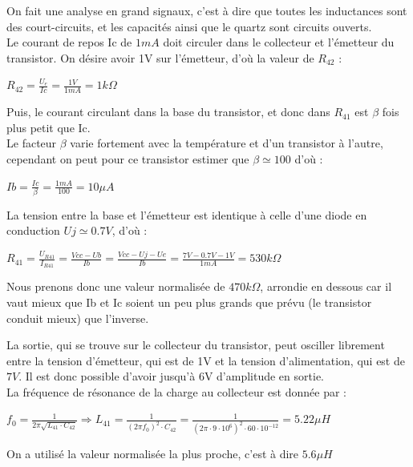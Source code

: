 \documentclass{article}
\begin{document}
On fait une analyse en grand signaux, c'est à dire que toutes les inductances sont des court-circuits, et les capacités ainsi que le quartz sont circuits ouverts.\\
Le courant de repos Ic de $1mA$ doit circuler dans le collecteur et l'émetteur du transistor. On désire avoir 1V sur l'émetteur, d'où la valeur de $R_{42}$ :
\begin{center}
$R_{42} = \frac{U_e}{Ic} = \frac{1V}{1mA} = 1k\Omega$
\end{center}
Puis, le courant circulant dans la base du transistor, et donc dans $R_{41}$ est $\beta$ fois plus petit que Ic.\\
Le facteur $\beta$ varie fortement avec la température et d'un transistor à l'autre, cependant on peut pour ce transistor estimer que $\beta \simeq 100$ d'où :
\begin{center}
$Ib = \frac{Ic}{\beta} = \frac{1mA}{100} = 10\mu A$
\end{center}
La tension entre la base et l'émetteur est identique à celle d'une diode en conduction $Uj \simeq 0.7V$, d'où :
\begin{center}
$R_{41} = \frac{U_{R41}}{I_{R41}} = \frac{Vcc - Ub}{Ib} = \frac{Vcc - Uj - Ue}{Ib} = \frac{7V - 0.7V - 1V}{1mA} = 530k\Omega$
\end{center}
Nous prenons donc une valeur normalisée de $470k\Omega$, arrondie en dessous car il vaut mieux que Ib et Ic soient un peu plus grands que prévu (le transistor conduit mieux) que l'inverse.\\


La sortie, qui se trouve sur le collecteur du transistor, peut osciller librement entre la tension d'émetteur, qui est de 1V et la tension d'alimentation, qui est de $7V$. Il est donc possible d'avoir jusqu'à 6V d'amplitude en sortie.\\

La fréquence de résonance de la charge au collecteur est donnée par :
\begin{center}
$f_0 = \frac{1}{2\pi \sqrt{L_{41} \cdot C_{42}}}
\Rightarrow
L_{41} = \frac{1}{(2\pi f_0)^2 \cdot C_{42}} = \frac{1}{(2\pi \cdot 9 \cdot 10^6)^2 \cdot 60 \cdot 10^{-12}} = 5.22 \mu H$
\end{center}
On a utilisé la valeur normalisée la plus proche, c'est à dire $5.6 \mu H$
\end{document}
